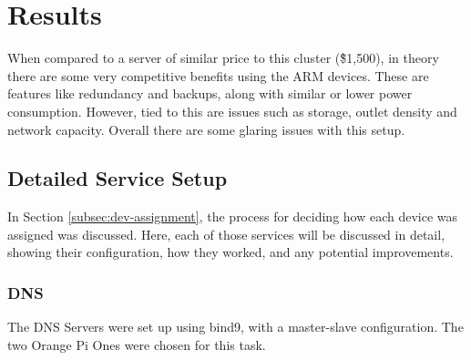 \documentclass[12pt]{spieman}  %
\begin{document}
\section{Results}
\label{sec:results}

When compared to a server of similar price to this cluster (\~ \$1,500), in theory there are some very competitive benefits using the ARM devices. These are features like redundancy and backups, along with similar or lower power consumption. However, tied to this are issues such as storage, outlet density and network capacity. Overall there are some glaring issues with this setup.\\

\subsection{Detailed Service Setup}
\label{subsec:services-detail}

In Section \ref{subsec:dev-assignment}, the process for deciding how each device was assigned was discussed. Here, each of those services will be discussed in detail, showing their configuration, how they worked, and any potential improvements.

\subsubsection{DNS}
\label{subsubsec:dns-config}

The DNS Servers were set up using bind9, with a master-slave configuration. The two Orange Pi Ones were chosen for this task.
\end{document}
